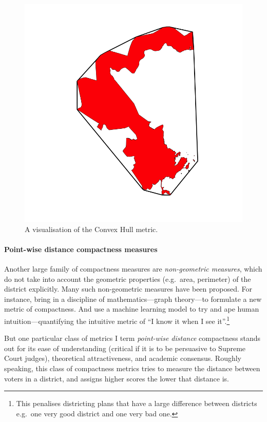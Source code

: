 \documentclass[]{article}
\let\oldparagraph\paragraph
\renewcommand{\paragraph}[1]{\oldparagraph{#1}\mbox{}}
\begin{document}
\begin{figure}
\centering
\includegraphics{img/ch.png}
\caption{A visualisation of the Convex Hull metric.}
\end{figure}

\hypertarget{point-wise-distance-compactness-measures}{%
\paragraph{Point-wise distance compactness
measures}\label{point-wise-distance-compactness-measures}}

Another large family of compactness measures are \emph{non-geometric
measures}, which do not take into account the geometric properties
(e.g.~area, perimeter) of the district explicitly. Many such
non-geometric measures have been proposed. For instance, \cite{dc2016}
bring in a discipline of mathematics---graph theory---to formulate a new
metric of compactness. And \cite{kingwp} use a machine learning model to
try and ape human intuition---quantifying the intuitive metric of ``I
know it when I see it''.\footnote{This penalises districting plans that
  have a large difference between districts e.g.~one very good district
  and one very bad one.}

But one particular class of metrics I term \emph{point-wise distance}
compactness stands out for its ease of understanding (critical if it is
to be persuasive to Supreme Court judges), theoretical attractiveness,
and academic consensus. Roughly speaking, this class of compactness
metrics tries to measure the distance between voters in a district, and
assigns higher scores the lower that distance is.
\end{document}

